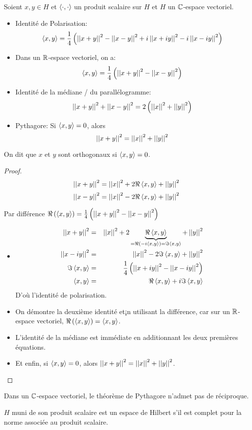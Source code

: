 \begin{prop}
	Soient $x,y \in H$ et $\left\langle \cdot, \cdot \right\rangle$ un produit scalaire sur $H$ et $H$ un $\mathbb{C}$-espace vectoriel.

	\begin{itemize}
		\item Identité de Polarisation:
		      $$\left\langle x, y \right\rangle = \frac{1}{4} \left( \left|\left|x+y\right|\right|^2 - \left|\left|x-y\right|\right|^2 + i\left|\left|x+iy\right|\right|^2 - i\left|\left|x-iy\right|\right|^2 \right)$$
		\item Dans un $\mathbb{R}$-espace vectoriel, on a:
		      $$\left\langle x, y \right\rangle = \frac{1}{4} \left( \left|\left|x+y\right|\right|^2 - \left|\left|x-y\right|\right|^2 \right)$$
		\item Identité de la médiane / du parallélogramme:
		      $$\left|\left|x+y\right|\right|^2 + \left|\left|x-y\right|\right|^2 = 2\left( \left|\left|x\right|\right|^2 + \left|\left|y\right|\right|^2 \right)$$
		\item Pythagore: Si $\left\langle x, y \right\rangle = 0$, alors
		      $$ \left|\left|x+y\right|\right|^2 = \left|\left|x\right|\right|^2 + \left|\left|y\right|\right|^2$$
	\end{itemize}
\end{prop}

\begin{definition}
	On dit que $x$ et $y$ sont orthogonaux si $\left\langle x, y \right\rangle = 0$.
\end{definition}

\begin{proof}
	$$\left|\left|x+y\right|\right|^2  = \left|\left|x\right|\right|^2 + 2\Re \left\langle x, y \right\rangle + \left|\left|y\right|\right|^2 $$
	$$\left|\left|x-y\right|\right|^2  = \left|\left|x\right|\right|^2 - 2\Re \left\langle x, y \right\rangle + \left|\left|y\right|\right|^2 $$

	Par différence $\Re \left(\left\langle x, y \right\rangle\right) = \frac{1}{4} \left( \left|\left|x+y\right|\right|^2 - \left|\left|x-y\right|\right|^2 \right)$
	\begin{itemize}
		\item
		      \begin{eqnarray*}
			      \left|\left|x+y\right|\right|^2  &=& \left|\left|x\right|\right|^2 + 2\underbrace{\Re \left\langle x, y \right\rangle }_{= \Re (-i\left\langle x, y \right\rangle) = \Im \left\langle x, y \right\rangle} + \left|\left|y\right|\right|^2 \\
			      \left|\left|x-iy\right|\right|^2 &=& \left|\left|x\right|\right|^2 - 2\Im \left\langle x, y \right\rangle + \left|\left|y\right|\right|^2 \\
			      \Im \left\langle x, y \right\rangle &=& \frac{1}{4} \left( \left|\left|x+iy\right|\right|^2 - \left|\left|x-iy\right|\right|^2 \right)\\
			      \left\langle x, y \right\rangle &=& \Re \left\langle x, y \right\rangle + i \Im \left\langle x, y \right\rangle
		      \end{eqnarray*}
		      D'où l'identité de polarisation.
		\item On démontre la deuxième identité et¡n utilisant la différence, car sur un $\mathbb{R}$-espace vectoriel, $\Re \left(\left\langle x, y \right\rangle\right) = \left\langle x, y \right\rangle$.
		\item L'identité de la médiane est immédiate en additionnant les deux premières équations.
		\item Et enfin, si $\left\langle x, y \right\rangle = 0$, alors $\left|\left|x+y\right|\right|^2 = \left|\left|x\right|\right|^2 + \left|\left|y\right|\right|^2$.
	\end{itemize} %
\end{proof}


\begin{remarque}
	Dans un $\mathbb{C}$-espace vectoriel, le théorème de Pythagore n'admet pas de réciproque.
\end{remarque}

\begin{definition}
	$H$ muni de son produit scalaire est un espace de Hilbert s'il est complet pour la norme associée au produit scalaire.
\end{definition}


